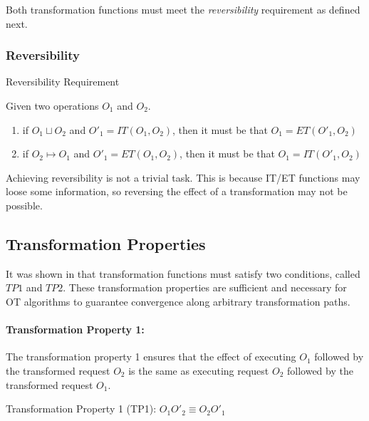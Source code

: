 \documentclass[11pt,a4paper]{article}
\begin{document}
Both transformation functions must meet the \emph{reversibility} requirement as defined next.

\subsubsection{Reversibility}
\begin{defn}
Reversibility Requirement
\end{defn}

Given two operations $O_{1}$ and $O_{2}$.

\begin{enumerate}
 \item if $O_{1} \sqcup O_{2}$ and $O'_{1} = IT(O_{1},O_{2})$, then it must
       be that $O_{1} = ET(O'_{1},O_{2})$
 \item if $O_{2} \mapsto O_{1}$ and $O'_{1} = ET(O_{1},O_{2})$, then it must
       be that $O_{1} = IT(O'_{1},O_{2})$
\end{enumerate}

Achieving reversibility is not a trivial task. This is because IT/ET functions may loose some information, so reversing the effect of a transformation may not be possible.


\subsection{Transformation Properties}
It was shown in \cite{ressel96} that transformation functions must satisfy two conditions, called $TP1$ and $TP2$. These transformation properties are sufficient and necessary for OT algorithms to guarantee convergence along arbitrary transformation paths.

\paragraph{Transformation Property 1:}
\label{sect:tp1}
The transformation property 1 ensures that the effect of executing $O_{1}$ followed by the transformed request $O_{2}$ is the same as executing request $O_{2}$ followed by the transformed request $O_{1}$. 

\begin{defn}
Transformation Property 1 (TP1):
$ O_{1} O'_{2} \equiv O_{2} O'_{1} $
\end{defn}
\end{document}
